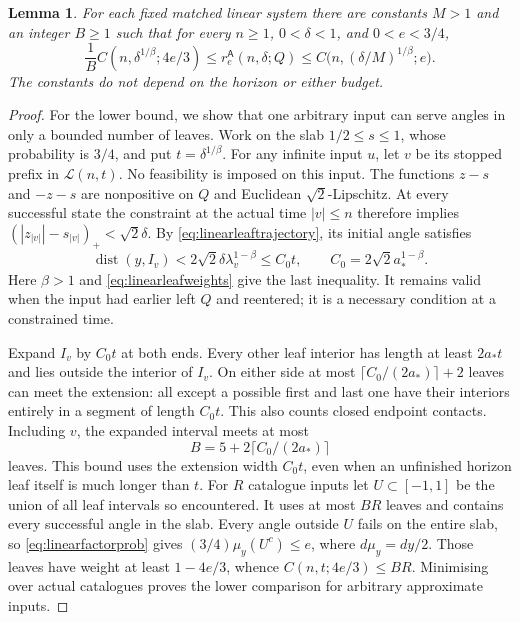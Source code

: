 \documentclass[11pt]{amsart}
\newtheorem{lemma}[theorem]{Lemma}
\theoremstyle{definition}
\theoremstyle{remark}
\newcommand{\dist}{\operatorname{dist}}
\numberwithin{equation}{section}
\begin{document}
\begin{lemma}\label{lem:linearfinite}
For each fixed matched linear system there are constants $M>1$
and an integer $B\ge1$ such that for every $n\ge1$,
$0<\delta<1$, and $0<e<3/4$,
\begin{equation}\label{eq:linearfinite}
\frac1B C(n,\delta^{1/\beta};4e/3)
\le r_e^{\mathsf A}(n,\delta;Q)
\le C\bigl(n,(\delta/M)^{1/\beta};e\bigr).
\end{equation}
The constants do not depend on the horizon or either budget.
\end{lemma}
\begin{proof}
For the lower bound, we show that one arbitrary input can serve
angles in only a bounded number of leaves. Work on the slab
$1/2\le s\le1$, whose probability is $3/4$, and put
$t=\delta^{1/\beta}$. For any infinite input $u$, let $v$
be its stopped prefix in
$\mathcal L(n,t)$. No feasibility is imposed on this input.
The functions $z-s$ and $-z-s$ are nonpositive on $Q$ and
Euclidean $\sqrt2$-Lipschitz. At every successful state the
constraint at the actual time $|v|\le n$ therefore implies
$(|z_{|v|}|-s_{|v|})_+<\sqrt2\delta$. By
\eqref{eq:linearleaftrajectory}, its initial angle satisfies
\begin{equation}\label{eq:leafextension}
\dist(y,I_v)<2\sqrt2\delta\lambda_v^{1-\beta}
 \le C_0t,\qquad C_0=2\sqrt2 a_*^{1-\beta}.
\end{equation}
Here $\beta>1$ and \eqref{eq:linearleafweights} give the last
inequality. It remains valid when the input had earlier left $Q$
and reentered; it is a necessary condition at a constrained time.

Expand $I_v$ by $C_0t$ at both ends. Every other leaf interior
has length at least $2a_*t$ and lies outside the interior of $I_v$.
On either side at most $\lceil C_0/(2a_*)\rceil+2$ leaves
can meet the extension: all except a possible first and last one
have their interiors entirely in a segment of length $C_0t$.
This also counts closed endpoint contacts. Including $v$, the
expanded interval meets at most
\[
B=5+2\lceil C_0/(2a_*)\rceil
\]
leaves. This bound uses the extension width $C_0t$, even when
an unfinished horizon leaf itself is much longer than $t$.
For $R$ catalogue inputs let $U\subset[-1,1]$ be the union
of all leaf intervals so encountered. It uses at most $BR$ leaves
and contains every successful angle in the slab. Every angle
outside $U$ fails on the entire slab, so \eqref{eq:linearfactorprob}
gives $(3/4)\mu_y(U^c)\le e$, where $d\mu_y=dy/2$.
Those leaves have weight at least $1-4e/3$, whence
$C(n,t;4e/3)\le BR$. Minimising over actual catalogues proves
the lower comparison for arbitrary approximate inputs.


\end{proof}
\end{document}
